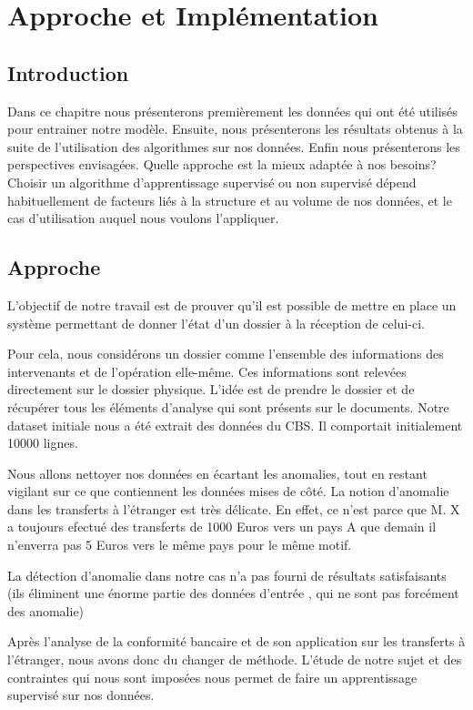 \chapter{Approche et Implémentation}

\section*{Introduction}
Dans ce chapitre nous présenterons premièrement les données qui ont été utilisés
pour entrainer notre modèle. Ensuite, nous présenterons les résultats obtenus à
la suite de l'utilisation des algorithmes sur nos données. Enfin nous 
présenterons les perspectives envisagées.
Quelle approche est la mieux adaptée à nos besoins? Choisir un algorithme 
d’apprentissage supervisé ou non supervisé dépend habituellement de 
facteurs liés à la structure et au volume de nos données, et le cas 
d’utilisation auquel nous voulons l’appliquer.


\section{Approche}

L'objectif de notre travail est de prouver qu'il est possible de mettre en place un
système permettant de donner l'état d'un dossier à la réception de celui-ci.

Pour cela, nous considérons un dossier comme l'ensemble des informations des 
intervenants et de l'opération elle-même. Ces informations sont relevées 
directement sur le dossier physique. L'idée est de prendre le dossier
et de récupérer tous les éléments d'analyse qui sont présents sur le documents.
Notre dataset initiale nous a été extrait des données du CBS. Il comportait
initialement 10000 lignes.

Nous allons nettoyer nos données en écartant les anomalies, tout en restant
vigilant sur ce que contiennent les données mises de côté. La notion d'anomalie
dans les transferts à l'étranger est très délicate. En effet, ce n'est parce que
M. X a toujours efectué des transferts de 1000 Euros vers un pays A que demain
il n'enverra pas 5 Euros vers le même pays pour le même motif.

La détection d'anomalie dans notre cas n'a pas fourni de résultats satisfaisants
(ils éliminent une énorme partie des données d'entrée , qui ne sont pas 
forcément des anomalie)

Après l'analyse de la conformité bancaire et de son application sur les transferts
à l'étranger, nous avons donc du changer de méthode. L'étude de notre sujet et
des contraintes qui nous sont imposées nous permet de faire un apprentissage
supervisé sur nos données.

